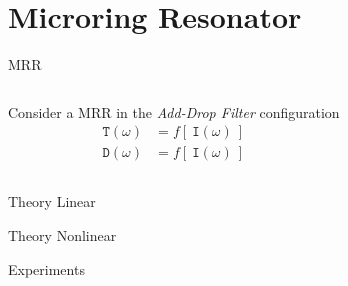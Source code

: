 \documentclass[11pt]{beamer}
\begin{document}
\section{Microring Resonator}
\begin{frame}{MRR}
	\begin{columns}
		Consider a MRR in the \textit{Add-Drop Filter} configuration
		\begin{align*}
			\texttt{T} \left( \omega \right) &= f \left[ ~\texttt{I} \left( \omega \right) ~\right] \\
			\texttt{D} \left( \omega \right) &= f \left[ ~\texttt{I} \left( \omega \right) ~\right]
		\end{align*}
		
		\begin{figure}
			\centering
			
		\end{figure}
	\end{columns}
\end{frame}
\begin{frame}{Theory}
Linear
\end{frame}
\begin{frame}{Theory}
Nonlinear
\end{frame}
\begin{frame}{Experiments}
	\begin{figure}
	
	\end{figure}
\end{frame}

\end{document}
